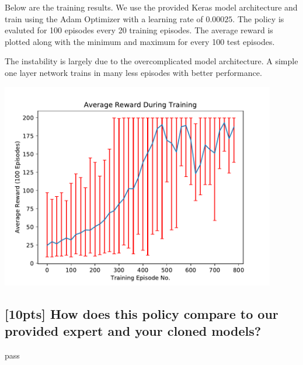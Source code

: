 \documentclass{article}
\begin{document}
Below are the training results. We use the provided Keras model architecture and train using the Adam Optimizer with a learning rate of $0.00025$. The policy is evaluted for 100 episodes every 20 training episodes. The average reward is plotted along with the minimum and maximum for every 100 test episodes.

The instability is largely due to the overcomplicated model architecture. A simple one layer network trains in many less episodes with better performance.
\begin{center}
  \includegraphics[width=12cm]{images/reinforce_plot.pdf}
\end{center}

\subsection{[10pts] How does this policy compare to our provided expert and your cloned models?}

pass



\small
\medskip


\end{document}
